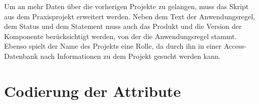 Um an mehr Daten über die vorherigen Projekte zu gelangen, muss das Skript aus dem Praxisprojekt erweitert werden. Neben dem Text der Anwendungsregel, dem Status und dem Statement
muss auch das Produkt und die Version der Komponente berücksichtigt werden, von der die Anwendungsregel stammt. Ebenso spielt der Name des Projekts eine Rolle,
da durch ihn in einer Access-Datenbank nach Informationen zu dem Projekt gesucht werden kann.

\section{Codierung der Attribute}
